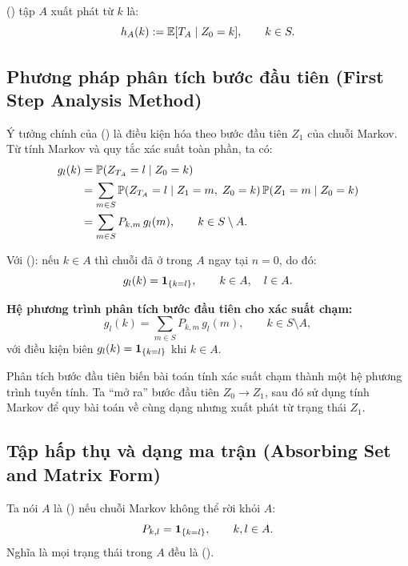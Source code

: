 \begin{dinhnghia}
 () tập $A$ xuất phát từ $k$ là:
\[
  h_A(k) := \mathbb{E}[T_A \mid Z_0 = k], \qquad k \in S.
\]
\end{dinhnghia}

\subsection{Phương pháp phân tích bước đầu tiên (First Step Analysis Method)}

Ý tưởng chính của  () là điều kiện hóa
theo bước đầu tiên $Z_1$ của chuỗi Markov. Từ tính Markov và quy tắc xác suất toàn phần,
ta có:
\begin{align*}
  g_l(k) &= \mathbb{P}(Z_{T_A} = l \mid Z_0 = k)\\
  &= \sum_{m \in S} \mathbb{P}(Z_{T_A} = l \mid Z_1 = m,\; Z_0 = k)\,\mathbb{P}(Z_1 = m \mid Z_0 = k)\\
  &= \sum_{m \in S} P_{k,m}\, g_l(m), \qquad k \in S \setminus A.
\end{align*}

Với  (): nếu $k \in A$ thì chuỗi đã ở trong $A$
ngay tại $n = 0$, do đó:
\[
  g_l(k) = \mathbf{1}_{\{k = l\}}, \qquad k \in A, \quad l \in A.
\]

\begin{congthuc}
\textbf{Hệ phương trình phân tích bước đầu tiên cho xác suất chạm:}
\[
  \boxed{
    g_l(k) = \sum_{m \in S} P_{k,m}\, g_l(m), \qquad k \in S \setminus A,
  }
\]
với điều kiện biên $g_l(k) = \mathbf{1}_{\{k = l\}}$ khi $k \in A$.
\end{congthuc}

\begin{tomtat}
Phân tích bước đầu tiên biến bài toán tính xác suất chạm thành một hệ phương trình tuyến tính.
Ta ``mở ra'' bước đầu tiên $Z_0 \to Z_1$, sau đó sử dụng tính Markov để quy bài toán
về cùng dạng nhưng xuất phát từ trạng thái $Z_1$.
\end{tomtat}

\subsection{Tập hấp thụ và dạng ma trận (Absorbing Set and Matrix Form)}

Ta nói $A$ là  () nếu chuỗi Markov không thể rời khỏi $A$:
\[
  P_{k,l} = \mathbf{1}_{\{k = l\}}, \qquad k, l \in A.
\]
Nghĩa là mọi trạng thái trong $A$ đều là  ().

